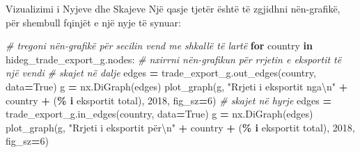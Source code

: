 \documentclass[
  ignorenonframetext,
]{beamer}
\newenvironment{Shaded}{\begin{snugshade}}{\end{snugshade}}
\newcommand{\CharTok}[1]{\textcolor[rgb]{0.31,0.60,0.02}{#1}}
\newcommand{\CommentTok}[1]{\textcolor[rgb]{0.56,0.35,0.01}{\textit{#1}}}
\newcommand{\ControlFlowTok}[1]{\textcolor[rgb]{0.13,0.29,0.53}{\textbf{#1}}}
\newcommand{\DecValTok}[1]{\textcolor[rgb]{0.00,0.00,0.81}{#1}}
\newcommand{\KeywordTok}[1]{\textcolor[rgb]{0.13,0.29,0.53}{\textbf{#1}}}
\newcommand{\NormalTok}[1]{#1}
\newcommand{\OperatorTok}[1]{\textcolor[rgb]{0.81,0.36,0.00}{\textbf{#1}}}
\newcommand{\SpecialCharTok}[1]{\textcolor[rgb]{0.81,0.36,0.00}{\textbf{#1}}}
\newcommand{\StringTok}[1]{\textcolor[rgb]{0.31,0.60,0.02}{#1}}
\newcommand{\VariableTok}[1]{\textcolor[rgb]{0.00,0.00,0.00}{#1}}
\begin{document}
\begin{frame}[fragile]{Vizualizimi i Nyjeve dhe Skajeve}
\protect\hypertarget{vizualizimi-i-nyjeve-dhe-skajeve-9}{}
Një qasje tjetër është të zgjidhni nën-grafikë, për shembull fqinjët e
një nyje të synuar:


\begin{Shaded}
\begin{Highlighting}[]
\CommentTok{\# tregoni nën{-}grafikë për secilin vend me shkallë të lartë}
\ControlFlowTok{for}\NormalTok{ country }\KeywordTok{in}\NormalTok{ hideg\_trade\_export\_g.nodes:}
    \CommentTok{\# nxirrni nën{-}grafikun për rrjetin e eksportit të një vendi}
    \CommentTok{\# skajet në dalje}
\NormalTok{    edges }\OperatorTok{=}\NormalTok{ trade\_export\_g.out\_edges(country, data}\OperatorTok{=}\VariableTok{True}\NormalTok{)}
\NormalTok{    g }\OperatorTok{=}\NormalTok{ nx.DiGraph(edges)}
\NormalTok{    plot\_graph(g, }\StringTok{"Rrjeti i eksportit nga}\CharTok{\textbackslash{}n}\StringTok{"} \OperatorTok{+}\NormalTok{ country }\OperatorTok{+} \StringTok{\textquotesingle{} (}\SpecialCharTok{\% i}\StringTok{ eksportit total)\textquotesingle{}}\NormalTok{, }\StringTok{\textquotesingle{}2018\textquotesingle{}}\NormalTok{, fig\_sz}\OperatorTok{=}\DecValTok{6}\NormalTok{)}
    \CommentTok{\# skajet në hyrje}
\NormalTok{    edges }\OperatorTok{=}\NormalTok{ trade\_export\_g.in\_edges(country, data}\OperatorTok{=}\VariableTok{True}\NormalTok{)}
\NormalTok{    g }\OperatorTok{=}\NormalTok{ nx.DiGraph(edges)}
\NormalTok{    plot\_graph(g, }\StringTok{"Rrjeti i eksportit për}\CharTok{\textbackslash{}n}\StringTok{"} \OperatorTok{+}\NormalTok{ country }\OperatorTok{+} \StringTok{\textquotesingle{} (}\SpecialCharTok{\% i}\StringTok{ eksportit total)\textquotesingle{}}\NormalTok{, }\StringTok{\textquotesingle{}2018\textquotesingle{}}\NormalTok{, fig\_sz}\OperatorTok{=}\DecValTok{6}\NormalTok{)}
\end{Highlighting}
\end{Shaded}
\end{frame}
\end{document}
